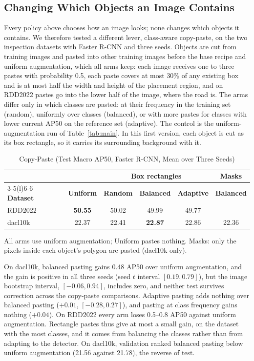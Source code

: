 \documentclass[conference]{IEEEtran}
\begin{document}
\subsection{Changing Which Objects an Image Contains}
\label{sec:results_paste}

Every policy above chooses how an image looks; none changes which objects it contains. We therefore tested a different lever, class-aware copy-paste, on the two inspection datasets with Faster R-CNN and three seeds. Objects are cut from training images and pasted into other training images before the base recipe and uniform augmentation, which all arms keep: each image receives one to three pastes with probability 0.5, each paste covers at most 30\% of any existing box and is at most half the width and height of the placement region, and on RDD2022 pastes go into the lower half of the image, where the road is. The arms differ only in which classes are pasted: at their frequency in the training set (random), uniformly over classes (balanced), or with more pastes for classes with lower current AP50 on the reference set (adaptive). The control is the uniform-augmentation run of Table~\ref{tab:main}. In this first version, each object is cut as its box rectangle, so it carries its surrounding background with it.

\begin{table}[t]
\caption{Copy-Paste (Test Macro AP50, Faster R-CNN, Mean over Three Seeds)}
\label{tab:paste}
\centering
\footnotesize
\setlength{\tabcolsep}{3.5pt}
\begin{tabular}{@{}lccccc@{}}
\toprule
 & & \multicolumn{3}{c}{\textbf{Box rectangles}} & \textbf{Masks} \\
\cmidrule(lr){3-5}\cmidrule(l){6-6}
\textbf{Dataset} & \textbf{Uniform} & \textbf{Random} & \textbf{Balanced} & \textbf{Adaptive} & \textbf{Balanced} \\
\midrule
RDD2022 & \textbf{50.55} & 50.02 & 49.99 & 49.77 & -- \\
dacl10k & 22.37 & 22.41 & \textbf{22.87} & 22.86 & 22.36 \\
\bottomrule
\end{tabular}
\vspace{2pt}

\parbox{\columnwidth}{\footnotesize All arms use uniform augmentation; Uniform pastes nothing. Masks: only the pixels inside each object's polygon are pasted (dacl10k only).}
\end{table}

On dacl10k, balanced pasting gains 0.48 AP50 over uniform augmentation, and the gain is positive in all three seeds (seed $t$ interval $[0.19, 0.79]$), but the image bootstrap interval, $[-0.06, 0.94]$, includes zero, and neither test survives correction across the copy-paste comparisons. Adaptive pasting adds nothing over balanced pasting ($+0.01$, $[-0.28, 0.27]$), and pasting at class frequency gains nothing ($+0.04$). On RDD2022 every arm loses 0.5--0.8 AP50 against uniform augmentation. Rectangle pastes thus give at most a small gain, on the dataset with the most classes, and it comes from balancing the classes rather than from adapting to the detector. On dacl10k, validation ranked balanced pasting below uniform augmentation (21.56 against 21.78), the reverse of test.
\end{document}
